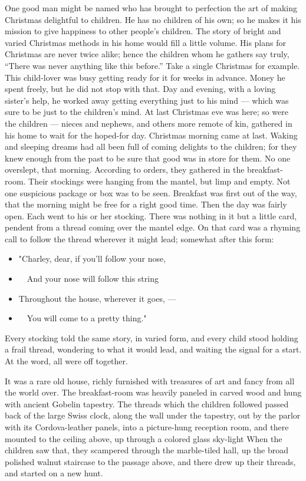 \documentclass[
]{book}
\providecommand{\tightlist}{%
  \setlength{\itemsep}{0pt}\setlength{\parskip}{0pt}}
\begin{document}
One good man might be named who has brought to perfection the art of making Christmas delightful to children. He has no children of his own; so he makes it his mission to give happiness to other people's children. The story of bright and varied Christmas methods in his home would fill a little volume. His plans for Christmas are never twice alike; hence the children whom he gathers say truly, ``There was never anything like this before.'' Take a single Christmas for example. This child-lover was busy getting ready for it for weeks in advance. Money he spent freely, but he did not stop with that. Day and evening, with a loving sister's help, he worked away getting everything just to his mind --- which was sure to be just to the children's mind. At last Christmas eve was here; so were the children --- nieces and nephews, and others more remote of kin, gathered in his home to wait for the hoped-for day. Christmas morning came at last. Waking and sleeping dreams had all been full of coming delights to the children; for they knew enough from the past to be sure that good was in store for them. No one overslept, that morning. According to orders, they gathered in the breakfast-room. Their stockings were hanging from the mantel, but limp and empty. Not one suspicious package or box was to be seen. Breakfast was first out of the way, that the morning might be free for a right good time. Then the day was fairly open. Each went to his or her stocking. There was nothing in it but a little card, pendent from a thread coming over the mantel edge. On that card was a rhyming call to follow the thread wherever it might lead; somewhat after this form:

\begin{itemize}
\tightlist
\item
  "Charley, dear, if you'll follow your nose,
\item
  ~~And your nose will follow this string
\item
  Throughout the house, wherever it goes, ---
\item
  ~~You will come to a pretty thing."
\end{itemize}

Every stocking told the same story, in varied form, and every child stood holding a frail thread, wondering to what it would lead, and waiting the signal for a start. At the word, all were off together.

It was a rare old house, richly furnished with treasures of art and fancy from all the world over. The breakfast-room was heavily paneled in carved wood and hung with ancient Gobelin tapestry. The threads which the children followed passed back of the large Swiss clock, along the wall under the tapestry, out by the parlor with its Cordova-leather panels, into a picture-hung reception room, and there mounted to the ceiling above, up through a colored glass sky-light When the children saw that, they scampered through the marble-tiled hall, up the broad polished walnut staircase to the passage above, and there drew up their threads, and started on a new hunt.
\end{document}
